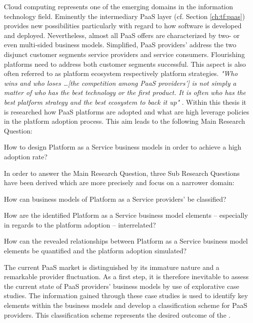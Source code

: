 Cloud computing represents one of the emerging domains in the information technology field. Eminently the intermediary \ac{PaaS} layer (cf. Section \ref{ch:tf:paas}) provides new possibilities particularly with regard to how software is developed and deployed. Nevertheless, almost all \ac{PaaS} offers are characterized by two- or even multi-sided business models. Simplified, \ac{PaaS} providers' address the two disjunct customer segments service providers and service consumers. Flourishing platforms need to address both customer segments successful. This aspect is also often referred to as platform ecosystem respectively platform strategies. \textit{"Who wins and who loses \ldots [the competition among \ac{PaaS} providers'] is not simply a matter of who has the best technology or the first product. It is often who has the best platform strategy and the best ecosystem to back it up"} \citep[p. 34]{Cusumano2010}. Within this thesis it is researched how \ac{PaaS} platforms are adopted and what are high leverage policies in the platform adoption process. This aim leads to the following Main Research Question:

\begin{MRQ}\label{mrq}
How to design Platform as a Service business models in order to achieve a high adoption rate?
\end{MRQ}

In order to answer the Main Research Question, three Sub Research Questions have been derived which are more precisely and focus on a narrower domain:

\begin{SRQ}\label{srq1}
How can business models of Platform as a Service providers' be classified?
\end{SRQ}

\begin{SRQ}\label{srq2}
How are the identified Platform as a Service business model elements -- especially in regards to the platform adoption -- interrelated?
\end{SRQ}

\begin{SRQ}\label{srq3}
How can the revealed relationships between Platform as a Service business model elements be quantified and the platform adoption simulated?
\end{SRQ}

The current \ac{PaaS} market is distinguished by its immature nature and a remarkable provider fluctuation. As a first step, it is therefore inevitable to assess the current state of \ac{PaaS} providers' business models by use of explorative case studies. The information gained through these case studies is used to identify key elements within the business models and develop a classification scheme for \ac{PaaS} providers. This classification scheme represents the desired outcome of the . 

